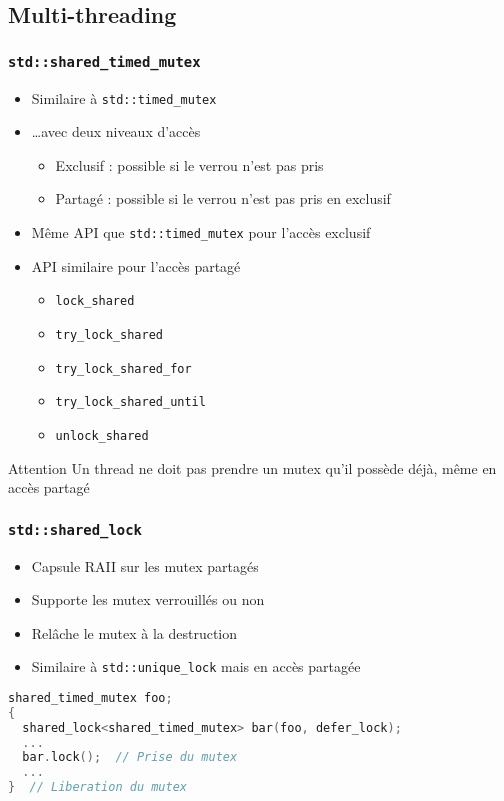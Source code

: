 \documentclass[C++.tex]{subfiles}
\begin{document}
\subsection*{Multi-threading}
\begin{frame}[fragile]
	\frametitle{\lstinline|std::shared_timed_mutex|}
	\begin{itemize}
		\item Similaire à \lstinline|std::timed_mutex|
		\item \ldots{}avec deux niveaux d'accès
		\begin{itemize}
			\item Exclusif : possible si le verrou n'est pas pris
			\item Partagé : possible si le verrou n'est pas pris en exclusif
		\end{itemize}
		\item Même API que \lstinline|std::timed_mutex|  pour l'accès exclusif
		\item API similaire pour l'accès partagé
		\begin{itemize}
			\item \lstinline|lock_shared|
			\item \lstinline|try_lock_shared|
			\item \lstinline|try_lock_shared_for|
			\item \lstinline|try_lock_shared_until|
			\item \lstinline|unlock_shared|
		\end{itemize}
	\end{itemize}

	\begin{alertblock}{Attention}
		Un thread ne doit pas prendre un mutex qu'il possède déjà, même en accès partagé
	\end{alertblock}
\end{frame}

\begin{frame}[fragile]
	\frametitle{\lstinline|std::shared_lock|}
	\begin{itemize}
		\item Capsule RAII sur les mutex partagés
		\item Supporte les mutex verrouillés ou non
		\item Relâche le mutex à la destruction
		\item Similaire à \lstinline|std::unique_lock| mais en accès partagée
	\end{itemize}

	\begin{lstlisting}[language=C++]
shared_timed_mutex foo;
{
  shared_lock<shared_timed_mutex> bar(foo, defer_lock);
  ...
  bar.lock();  // Prise du mutex
  ...
}  // Liberation du mutex\end{lstlisting}
\end{frame}
\end{document}

